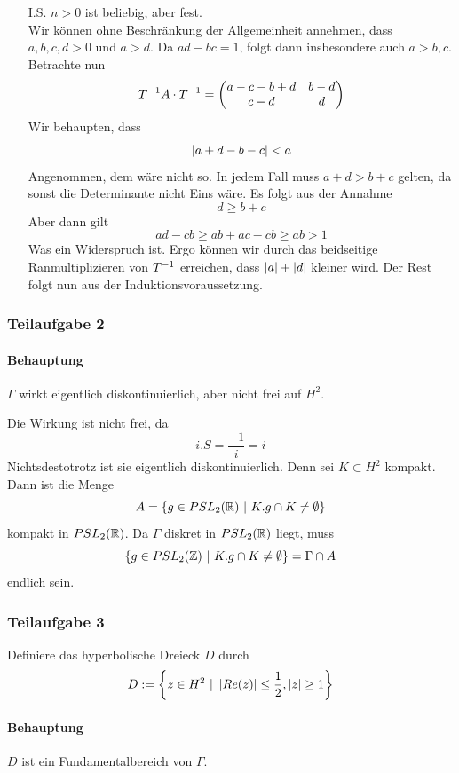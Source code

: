 \documentclass{book}
\begin{document}
\begin{Beweis}{}
\begin{enumerate}[1.]
\begin{enumerate}
			\item[I.S.] $n>0$ ist beliebig, aber fest.\\
			Wir können ohne Beschränkung der Allgemeinheit annehmen, dass $a,b,c,d > 0$ und $a > d$. Da $ad -bc = 1$, folgt dann insbesondere auch $a>b,c$. Betrachte nun
			\[ T^{-1} A \cdot T^{-1} = \left(\begin{matrix}
			a - c - b +d & b - d\\
			c - d & d
			\end{matrix}\right)\]
		Wir behaupten, dass
		\[ \left| a + d -b -c \right|< a \]
		Angenommen, dem wäre nicht so. In jedem Fall muss $a + d > b +c$ gelten, da sonst die Determinante nicht Eins wäre. Es folgt aus der Annahme
		\[ d\geq b+c \]
		Aber dann gilt
		\[ ad -cb\geq ab + ac -cb\geq ab > 1 \]
		Was ein Widerspruch ist. Ergo können wir durch das beidseitige Ranmultiplizieren von $T^{-1}$ erreichen, dass $\left|a\right| + \left|d\right|$ kleiner wird. Der Rest folgt nun aus der Induktionsvoraussetzung.
		\end{enumerate}
	\end{enumerate}
\end{Beweis}

\subsubsection{Teilaufgabe 2}
\paragraph{Behauptung}
$\Gamma$ wirkt eigentlich diskontinuierlich, aber nicht frei auf $H^2$.
\begin{Beweis}{}
	Die Wirkung ist nicht frei, da
	\[ i.S = \frac{-1}{i} = i \]
	Nichtsdestotrotz ist sie eigentlich diskontinuierlich. Denn sei $K \subset H^2$ kompakt. Dann ist die Menge
	\[ A = \set{g \in PSL_2(\R)}{K.g \cap K \neq \emptyset} \]
	kompakt in $PSL_2(\mathbb{R})$. Da $\Gamma$ diskret in $PSL_2(\mathbb{R})$ liegt, muss
	\[ \set{g \in PSL_2(\Z)}{K.g \cap K \neq \emptyset} = \Gamma \cap A \]
	endlich sein.
\end{Beweis}

\subsubsection{Teilaufgabe 3}
Definiere das hyperbolische Dreieck $D$ durch
\[ D:= \set{z \in H^2}{ \bet{Re(z)} \leq \frac{1}{2}, \bet{z} \geq 1 } \]
\paragraph{Behauptung}
$D$ ist ein Fundamentalbereich von $\Gamma$.
\end{document}
